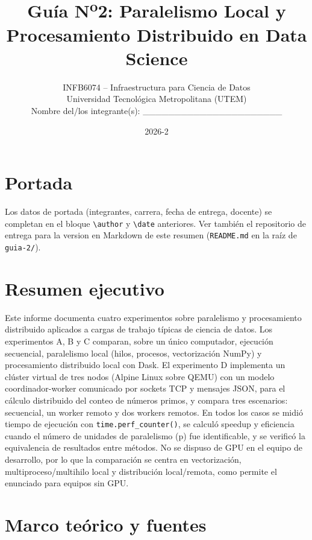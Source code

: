 \documentclass[11pt]{article}
\title{Guía N\textsuperscript{o}2: Paralelismo Local y Procesamiento Distribuido en Data Science}
\author{INFB6074 -- Infraestructura para Ciencia de Datos \\ Universidad Tecnológica Metropolitana (UTEM) \\ Nombre del/los integrante(s): \_\_\_\_\_\_\_\_\_\_\_\_\_\_\_\_\_\_\_\_\_\_}
\date{2026-2}
\begin{document}
\maketitle
\tableofcontents
\newpage

\section{Portada}

Los datos de portada (integrantes, carrera, fecha de entrega, docente) se
completan en el bloque \texttt{\textbackslash author} y \texttt{\textbackslash date}
anteriores. Ver también el repositorio de entrega para la version en
Markdown de este resumen (\texttt{README.md} en la raíz de \texttt{guia-2/}).

\section{Resumen ejecutivo}

Este informe documenta cuatro experimentos sobre paralelismo y
procesamiento distribuido aplicados a cargas de trabajo típicas de ciencia
de datos. Los experimentos A, B y C comparan, sobre un único computador,
ejecución secuencial, paralelismo local (hilos, procesos, vectorización
NumPy) y procesamiento distribuido local con Dask. El experimento D
implementa un clúster virtual de tres nodos (Alpine Linux sobre QEMU) con un
modelo coordinador-worker comunicado por sockets TCP y mensajes JSON, para
el cálculo distribuido del conteo de números primos, y compara tres
escenarios: secuencial, un worker remoto y dos workers remotos. En todos los
casos se midió tiempo de ejecución con \texttt{time.perf\_counter()}, se
calculó speedup y eficiencia cuando el número de unidades de paralelismo
(p) fue identificable, y se verificó la equivalencia de resultados entre
métodos. No se dispuso de GPU en el equipo de desarrollo, por lo que la
comparación se centra en vectorización, multiproceso/multihilo local y
distribución local/remota, como permite el enunciado para equipos sin GPU.

\section{Marco teórico y fuentes}
\end{document}
